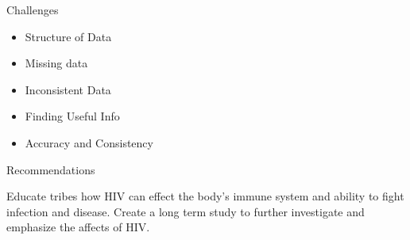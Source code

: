 \documentclass[ignorenonframetext,]{beamer}
\providecommand{\tightlist}{%
\setlength{\itemsep}{0pt}\setlength{\parskip}{0pt}}
\begin{document}
\begin{frame}{Challenges}

\begin{itemize}
\tightlist
\item
  Structure of Data
\item
  Missing data
\item
  Inconsistent Data
\item
  Finding Useful Info
\item
  Accuracy and Consistency
\end{itemize}

\end{frame}

\begin{frame}{Recommendations}

Educate tribes how HIV can effect the body's immune system and ability
to fight infection and disease. Create a long term study to further
investigate and emphasize the affects of HIV.

\end{frame}
\end{document}

